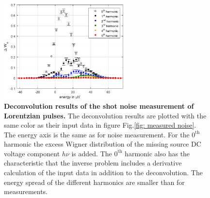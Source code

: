 \begin{figure}[hpbt]
	\centering
	\includegraphics[width = 6.5cm]{./chap1/wigner_harmonic_deconvoluted}
	\caption{\textbf{Deconvolution results of the shot noise measurement of Lorentzian pulses.}  The deconvolution results are plotted with the same color as their input data in figure Fig.\ref{fig: measured noise}. The energy axis is the same as for noise measurement. For the $0^{\mathrm{th}}$ harmonic the excess Wigner distribution of the missing source DC voltage component $h\nu$ is added. The $0^{\mathrm{th}}$ harmonic also has the characteristic that the inverse problem includes a derivative calculation of the input data in addition to the deconvolution. The energy spread of the different harmonics are smaller than for measurements.}
	\label{fig: after deconvolution}
\end{figure}


\newpage

